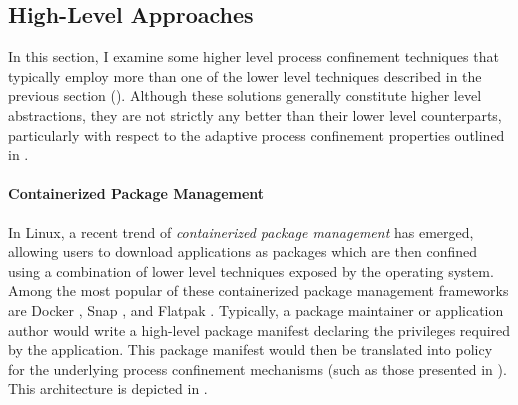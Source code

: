 \documentclass[dvipsnames, 12pt]{article}
\begin{document}

\subsection{High-Level Approaches} 
\label{sec:high-level}

In this section, I examine some higher level process confinement techniques that
typically employ more than one of the lower level techniques described in the
previous section (). Although these solutions generally
constitute higher level abstractions, they are not strictly any better than
their lower level counterparts, particularly with respect to the adaptive
process confinement properties outlined in .

\paragraph*{Containerized Package Management}
In Linux, a recent trend of \textit{containerized package management} has
emerged, allowing users to download applications as packages which are then
confined using a combination of lower level techniques exposed by the operating
system. Among the most popular of these containerized package management
frameworks are Docker \cite{docker}, Snap \cite{snap}, and Flatpak
\cite{flatpak}. Typically, a package maintainer or application author would
write a high-level package manifest declaring the privileges required by the
application. This package manifest would then be translated into policy for the
underlying process confinement mechanisms (such as those presented in
). This architecture is depicted in
.
\end{document}
